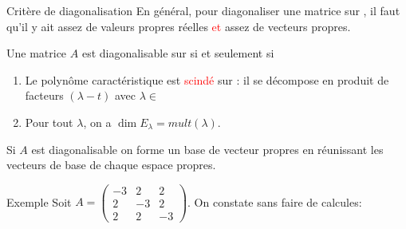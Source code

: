 \begin{parag}{Critère de diagonalisation}
    En général, pour diagonaliser une matrice sur \R, il faut qu'il y ait assez de valeurs propres réelles \textcolor{red}{et} assez de vecteurs propres.
    \begin{theoreme}
        Une matrice $A$ est diagonalisable sur \R si et seulement si 
        \begin{enumerate}
            \item Le polynôme caractéristique est \textcolor{red}{scindé} sur \R : il se décompose en produit de facteurs $(\lambda - t)$ avec $\lambda \in $ \R
            \item Pour tout $\lambda$, on a $\dim E_\lambda = mult(\lambda)$.
        \end{enumerate}
    \end{theoreme}
    Si $A$ est diagonalisable on forme un base de vecteur propres en réunissant les vecteurs de base de chaque espace propres.
    \begin{subparag}{Exemple}
        Soit $A = \begin{pmatrix}
            -3 & 2 & 2\\
            2 & -3 & 2\\
            2 & 2 & -3
        \end{pmatrix}$. On constate sans faire de calcules:
\end{subparag}
\end{parag}
